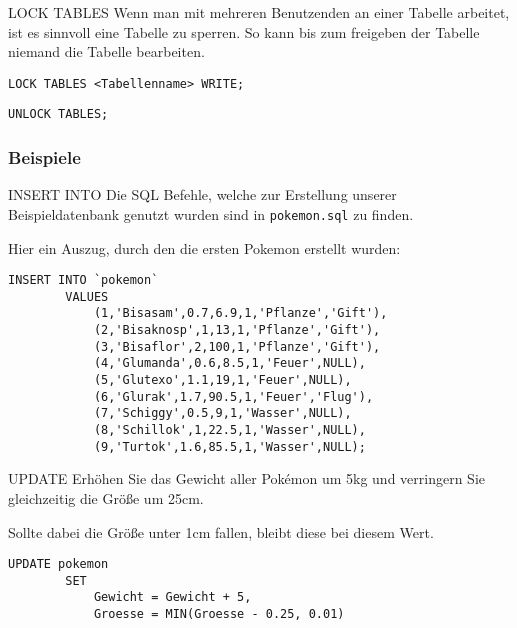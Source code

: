 \begin{sqlbonus}{LOCK TABLES}
    Wenn man mit mehreren Benutzenden an einer Tabelle arbeitet, ist es sinnvoll eine Tabelle zu sperren.
    So kann bis zum freigeben der Tabelle niemand die Tabelle bearbeiten.

    \begin{lstlisting}[language=mysql]
        LOCK TABLES <Tabellenname> WRITE;
    \end{lstlisting}

    \begin{lstlisting}[language=mysql]
        UNLOCK TABLES;
    \end{lstlisting}
\end{sqlbonus}

\subsubsection{Beispiele}

\begin{example}{INSERT INTO}
    Die SQL Befehle, welche zur Erstellung unserer Beispieldatenbank genutzt wurden sind in \texttt{pokemon.sql} zu finden.

    Hier ein Auszug, durch den die ersten Pokemon erstellt wurden:

    \begin{lstlisting}[language=mysql]
        INSERT INTO `pokemon`
        VALUES
            (1,'Bisasam',0.7,6.9,1,'Pflanze','Gift'),
            (2,'Bisaknosp',1,13,1,'Pflanze','Gift'),
            (3,'Bisaflor',2,100,1,'Pflanze','Gift'),
            (4,'Glumanda',0.6,8.5,1,'Feuer',NULL),
            (5,'Glutexo',1.1,19,1,'Feuer',NULL),
            (6,'Glurak',1.7,90.5,1,'Feuer','Flug'),
            (7,'Schiggy',0.5,9,1,'Wasser',NULL),
            (8,'Schillok',1,22.5,1,'Wasser',NULL),
            (9,'Turtok',1.6,85.5,1,'Wasser',NULL);
    \end{lstlisting}
\end{example}

\begin{example}{UPDATE}
    Erhöhen Sie das Gewicht aller Pokémon um 5kg und verringern Sie gleichzeitig die Größe um 25cm.

    Sollte dabei die Größe unter 1cm fallen, bleibt diese bei diesem Wert.

    \exampleseparator

    \begin{lstlisting}[language=mysql]
        UPDATE pokemon
        SET
            Gewicht = Gewicht + 5,
            Groesse = MIN(Groesse - 0.25, 0.01)
    \end{lstlisting}
\end{example}


